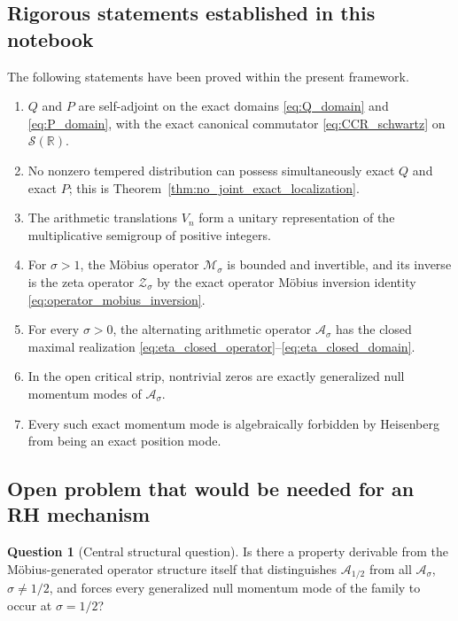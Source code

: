 \documentclass[11pt]{amsart}
\numberwithin{equation}{section}
\theoremstyle{plain}
\theoremstyle{definition}
\newtheorem{question}[theorem]{Question}
\theoremstyle{remark}
\newcommand{\R}{\mathbb{R}}
\newcommand{\Sch}{\mathcal{S}}
\begin{document}
\subsection{Rigorous statements established in this notebook}
\label{subsec:rigorous_summary}

The following statements have been proved within the present framework.

\begin{enumerate}[leftmargin=*]
\item $Q$ and $P$ are self-adjoint on the exact domains
\eqref{eq:Q_domain} and \eqref{eq:P_domain}, with the exact canonical
commutator \eqref{eq:CCR_schwartz} on $\Sch(\R)$.

\item No nonzero tempered distribution can possess simultaneously exact
$Q$ and exact $P$; this is Theorem~\ref{thm:no_joint_exact_localization}.

\item The arithmetic translations $V_n$ form a unitary representation of
the multiplicative semigroup of positive integers.

\item For $\sigma>1$, the M\"obius operator
$\mathcal M_\sigma$ is bounded and invertible, and its inverse is the zeta
operator $\mathcal Z_\sigma$ by the exact operator M\"obius inversion
identity \eqref{eq:operator_mobius_inversion}.

\item For every $\sigma>0$, the alternating arithmetic operator
$\mathcal A_\sigma$ has the closed maximal realization
\eqref{eq:eta_closed_operator}--\eqref{eq:eta_closed_domain}.

\item In the open critical strip, nontrivial zeros are exactly generalized
null momentum modes of $\mathcal A_\sigma$.

\item Every such exact momentum mode is algebraically forbidden by
Heisenberg from being an exact position mode.
\end{enumerate}

\subsection{Open problem that would be needed for an RH mechanism}
\label{subsec:RH_mechanism_open}

\begin{question}[Central structural question]
\label{q:central_structural_question}
Is there a property derivable from the M\"obius-generated operator structure
itself that distinguishes $\mathcal A_{1/2}$ from all
$\mathcal A_\sigma$, $\sigma\neq1/2$, and forces every generalized null
momentum mode of the family to occur at $\sigma=1/2$?
\end{question}
\end{document}
